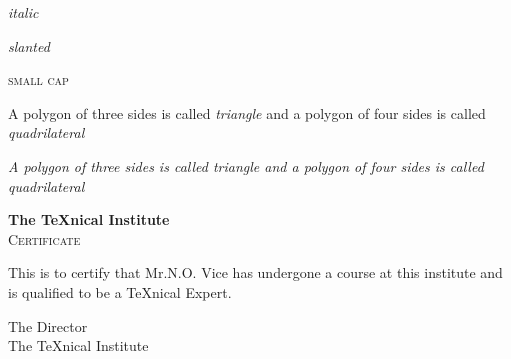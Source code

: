 \documentclass[a4paper, UTF8]{article}
\begin{document}
\textit{italic}

\textsl{slanted}

\textsc{small cap}

A polygon of three sides is called \emph{triangle} and a polygon of four sides is called \emph{quadrilateral}

\textit{A polygon of three sides is called \emph{triangle} and a polygon of four sides is called \emph{quadrilateral}}

\newpage
\begin{center}
	{\bfseries\huge The \TeX nical Institute}\\[1cm]
	{\scshape\LARGE Certificate}
\end{center}

\noindent This is to certify that Mr.N.O. Vice has undergone a course at this institute and is qualified to be a \TeX nical Expert.

\begin{flushright}
{\sffamily The Director\\
The \TeX nical Institute}
\end{flushright}
\end{document}
